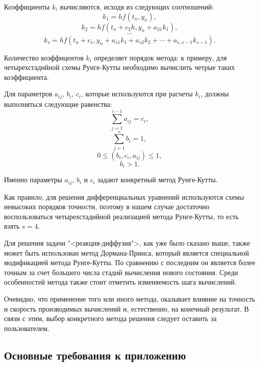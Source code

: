 \documentclass[a4paper, 14pt]{extarticle}
\theoremstyle{definition}
\begin{document}
\par Коэффициенты $k_i$ вычисляются, исходя из следующих соотношений:
$$k_1 = hf(t_n, y_n),$$
$$k_2 = hf(t_n + c_2 h, y_n + a_{21}k_1),$$
$$\cdots$$
$$k_s = hf(t_n + c_s, y_n + a_{s1}k_1 + a_{s2}k_2 + \cdots + a_{s,s-1}k_{s-1}).$$

\par Количество коэффицентов $k_i$ определяет порядок метода: к примеру, для четырехстадийной схемы Рунге-Кутты необходимо вычислить четрые таких коэффициента.

\par Для параметров $a_{ij}$, $b_i$, $c_i$, которые используются при расчеты $k_i$, должны выполняться следующие равенства:
$$\sum_{j=1}^{i-1}{a_{ij}} = c_i,$$
$$\sum_{j=1}^s{b_i} = 1,$$
$$0 \le (b_i, c_i, a_{ij}) \le 1,$$
$$b_i > 1.$$

\par Именно параметры $a_{ij}$, $b_i$ и $c_i$ задают конкретный метод Рунге-Кутты.

\par Как правило, для решения дифференциальных уравнений используются схемы невысоких порядков точности, поэтому в нашем случае достаточно воспользоваться четырехстадийной реализацией метода Рунге-Кутты, то есть взять $s = 4$.

\par Для решения задачи "<реакция-диффузия">, как уже было сказано выше, также может быть использован метод Дормана-Принса, который является специальной модификацией метода Рунге-Кутты. По сравнению с последним он является более точным за счет большего числа стадий вычисления нового состояния. Среди особенностей метода также стоит отметить изменяемость шага вычислений.

\par Очевидно, что применение того или иного метода, оказывает влияние на точность и скорость производимых вычислений и, естественно, на конечный результат. В связи с этим, выбор конкретного метода решения следует оставить за пользователем.



\subsection{Основные требования к приложению}
\end{document}
